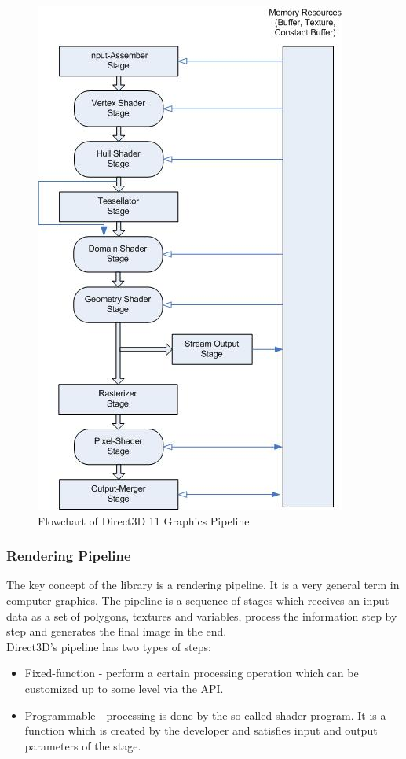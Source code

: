 \documentclass[twoside, english, 11pt]{report}
\begin{document}
\begin{figure}[!h]
\centerline{\includegraphics[scale=1]{img/pipeline}}
\caption{Flowchart of Direct3D 11 Graphics Pipeline\label{fig:pipeline}}
\end{figure}
\subsubsection{Rendering Pipeline}
The key concept of the library is a rendering pipeline. It is a very general term in computer graphics. The pipeline is a sequence of stages which receives an input data as a set of polygons, textures and variables, process the information step by step and generates the final image in the end.\\

Direct3D's pipeline has two types of steps:
\begin{itemize} 
\item Fixed-function - perform a certain processing operation which can be customized up to some level via the API.
\item Programmable - processing is done by the so-called shader program. It is a function which is created by the developer and satisfies input and output parameters of the stage.
\end{itemize}
\end{document}

